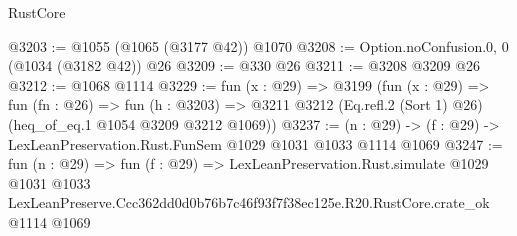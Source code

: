 \begin{lexlean}{RustCore}
\begin{coremodule}
@3203 := @1055 (@1065 (@3177 @42)) @1070
@3208 := Option.noConfusion.{0, 0} (@1034 (@3182 @42)) @26
@3209 := @330 @26
@3211 := @3208 @3209 @26
@3212 := @1068 @1114
@3229 := fun (x : @29) =>
  @3199
    (fun (x : @29) =>
    fun (fn : @26) =>
    fun (h : @3203) =>
    @3211 @3212 (Eq.refl.{2} (Sort 1) @26) (heq_of_eq.{1} @1054 @3209 @3212 @1069))
@3237 := (n : @29) -> (f : @29) -> LexLeanPreservation.Rust.FunSem @1029 @1031 @1033 @1114 @1069
@3247 := fun (n : @29) =>
  fun (f : @29) =>
  LexLeanPreservation.Rust.simulate
    @1029
    @1031
    @1033
    LexLeanPreserve.Ccc362dd0d0b76b7c46f93f7f38ec125e.R20.RustCore.crate_ok
    @1114
    @1069
\end{coremodule}
\end{lexlean}
